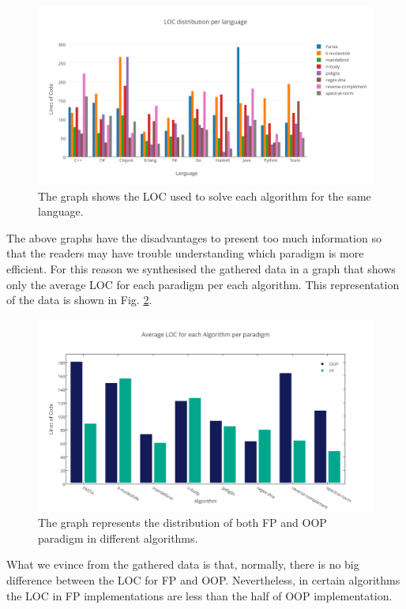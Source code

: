 \documentclass{article}
\begin{document}
\begin{figure}[h]
\includegraphics[width=\textwidth]{3}
\caption{The graph shows the LOC used to solve each algorithm for the same language.}
\label{fig:lang}
\end{figure}

The above graphs have the disadvantages to present too much information so that the readers may have trouble understanding which paradigm is more efficient. For this reason we synthesised the gathered data in a graph that shows only the average LOC for each paradigm per each algorithm. This representation of the data is shown in Fig. \ref{fig:fpvsoop}.

\begin{figure}[h]
\includegraphics[width=\textwidth]{1}
\caption{The graph represents the distribution of both FP and OOP paradigm in different algorithms.}
\label{fig:fpvsoop}
\end{figure}

What we evince from the gathered data is that, normally, there is no big difference between the LOC for FP and OOP. Nevertheless, in certain algorithms the LOC in FP implementations are less than the half of OOP implementation.
\end{document}
